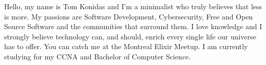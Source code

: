 \documentclass[9pt]{developercv} %
\begin{document}
\vspace{0.5cm}



\begin{minipage}[t]{0.4\textwidth} %
	\vspace{-\baselineskip} %
	
  Hello, my name is Tom Konidas and I'm a minimalist who truly believes that less is more. 
  My passions are Software Development, Cybersecurity, Free and Open Source Software and the communities that surround them.
  I love knowledge and I strongly believe technology can, and should, enrich every single 
  life our universe has to offer.
  You can catch me at the Montreal Elixir Meetup.
  I am currently studying for my CCNA and Bachelor of Computer Science.
\end{minipage}
\hfill %
\begin{minipage}[t]{0.5\textwidth} %
	\vspace{-\baselineskip} %
	\begin{barchart}{5.5}
	\end{barchart}
\end{minipage}


\end{document}

